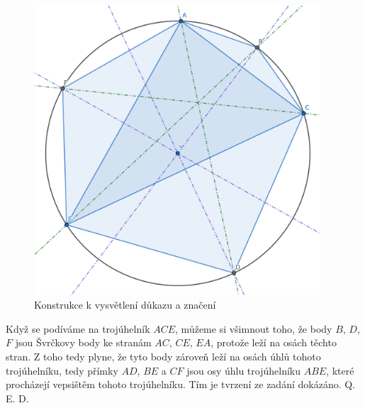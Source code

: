 \documentclass{fkssolpub}
\author{Ondřej Sedláček}
\begin{document}
\begin{figure}
  \begin{center}
    \includegraphics[width=0.95\textwidth]{2-fig.png}
  \end{center}
  \caption{Konstrukce k vysvětlení důkazu a značení}
  \label{fig:}
\end{figure}


Když se podíváme na trojúhelník $ACE$, můžeme si všimnout toho, že body $B$, $D$, $F$ jsou Švrčkovy body ke stranám $AC$, $CE$, $EA$, protože leží na osách těchto stran. Z toho tedy plyne, že tyto body zároveň leží na osách úhlů tohoto trojúhelníku, tedy přímky $AD$, $BE$ a $CF$ jsou osy úhlu trojúhelníku $ABE$, které procházejí vepsištěm tohoto trojúhelníku. Tím je tvrzení ze zadání dokázáno. Q. E. D.
\end{document}
